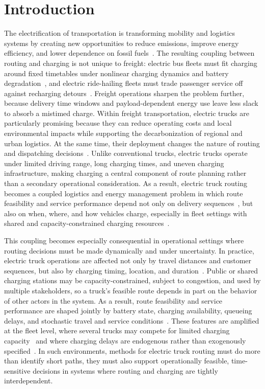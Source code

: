 \documentclass[a4paper,fleqn]{cas-sc}
\begin{document}
\maketitle

\section{Introduction}

The electrification of transportation is transforming mobility and logistics systems by creating new opportunities to reduce emissions, improve energy efficiency, and lower dependence on fossil fuels~\cite{ZHANG2022103152}. The resulting coupling between routing and charging is not unique to freight: electric bus fleets must fit charging around fixed timetables under nonlinear charging dynamics and battery degradation~\cite{jin2024buses}, and electric ride-hailing fleets must trade passenger service off against recharging detours~\cite{shi2020ridehailing}. Freight operations sharpen the problem further, because delivery time windows and payload-dependent energy use leave less slack to absorb a mistimed charge. Within freight transportation, electric trucks are particularly promising because they can reduce operating costs and local environmental impacts while supporting the decarbonization of regional and urban logistics. At the same time, their deployment changes the nature of routing and dispatching decisions~\cite{KUCUKOGLU2021107650}. Unlike conventional trucks, electric trucks operate under limited driving range, long charging times, and uneven charging infrastructure, making charging a central component of route planning rather than a secondary operational consideration. As a result, electric truck routing becomes a coupled logistics and energy management problem in which route feasibility and service performance depend not only on delivery sequences~\cite{osti_1615213}, but also on when, where, and how vehicles charge, especially in fleet settings with shared and capacity-constrained charging resources~\cite{BRAGIN2024104494}. 

This coupling becomes especially consequential in operational settings where routing decisions must be made dynamically and under uncertainty. In practice, electric truck operations are affected not only by travel distances and customer sequences, but also by charging timing, location, and duration~\cite {SPINELLI2026105480}. Public or shared charging stations may be capacity-constrained, subject to congestion, and used by multiple stakeholders, so a truck's feasible route depends in part on the behavior of other actors in the system. As a result, route feasibility and service performance are shaped jointly by battery state, charging availability, queueing delays, and stochastic travel and service conditions~\cite{KESKIN2021105060}. These features are amplified at the fleet level, where several trucks may compete for limited charging capacity~\cite{ev2gym} and where charging delays are endogenous rather than exogenously specified~\cite{WANG2025104932}. In such environments, methods for electric truck routing must do more than identify short paths, they must also support operationally feasible, time-sensitive decisions in systems where routing and charging are tightly interdependent.
\end{document}
